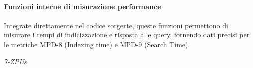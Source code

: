 \documentclass[a4paper,12pt]{article}
\begin{document}
\paragraph{Funzioni interne di misurazione performance}
Integrate direttamente nel codice sorgente, queste funzioni permettono di
misurare i tempi di indicizzazione e risposta alle query, fornendo dati precisi
per le metriche MPD-8 (Indexing time) e MPD-9 (Search Time).

\vfill
\begin{flushright}
    \textit{7-ZPUs}
\end{flushright}
\end{document}

